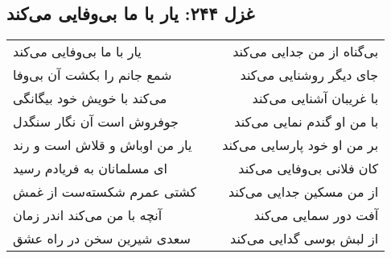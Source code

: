 \begin{center}
\section*{غزل ۲۴۴: یار با ما بی‌وفایی می‌کند}
\label{sec:244}
\begin{longtable}{l p{0.5cm} r}
یار با ما بی‌وفایی می‌کند
&&
بی‌گناه از من جدایی می‌کند
\\
شمع جانم را بکشت آن بی‌وفا
&&
جای دیگر روشنایی می‌کند
\\
می‌کند با خویش خود بیگانگی
&&
با غریبان آشنایی می‌کند
\\
جوفروش است آن نگار سنگدل
&&
با من او گندم نمایی می‌کند
\\
یار من اوباش و قلاش است و رند
&&
بر من او خود پارسایی می‌کند
\\
ای مسلمانان به فریادم رسید
&&
کان فلانی بی‌وفایی می‌کند
\\
کشتی عمرم شکسته‌ست از غمش
&&
از من مسکین جدایی می‌کند
\\
آنچه با من می‌کند اندر زمان
&&
آفت دور سمایی می‌کند
\\
سعدی شیرین سخن در راه عشق
&&
از لبش بوسی گدایی می‌کند
\\
\end{longtable}
\end{center}
